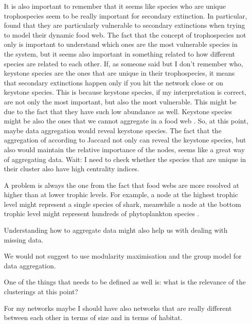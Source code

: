 \documentclass[twocolumn]{article}
\begin{document}
	It is also important to remember that it seems like species who are unique trophospecies seem to be really important for secondary extinction.
	In particular, \citep{Petchey2008a} found that they are particularly vulnerable to secondary extinctions when trying to model their dynamic food web.
	The fact that the concept of trophospecies not only is important to understand which ones are the most vulnerable species in the system, but it seems also important in something related to how different species are related to each other.
	If, as someone said but I don't remember who, keystone species are the ones that are unique in their trophospecies, it means that secondary extinctions happen only if you hit the network close or on keystone species.
	This is because keystone species, if my interpretation is correct, are not only the most important, but also the most vulnerable.
	This might be due to the fact that they have such low abundance as well.
	Keystone species might be also the ones that we cannot aggregate in a food web \citep{Bond1994}.
	So, at this point, maybe data aggregation would reveal keystone species.
	The fact that the aggregation of according to Jaccard not only can reveal the keystone species, but also would maintain the relative importance of the nodes, seems like a great way of aggregating data.
	Wait: I need to check whether the species that are unique in their cluster also have high centrality indices.
	\par
	A problem is always the one from the fact that food webs are more resolved at higher than at lower trophic levels.
	For example, a node at the highest trophic level might represent a single species of shark, meanwhile a node at the bottom trophic level might represent hundreds of phytoplankton species \citep{}.
	\par
	Understanding how to aggregate data might also help us with dealing with missing data.
	\par
	We would not suggest to use modularity maximisation and the group model for data aggregation.
	\par
	One of the things that needs to be defined as well is: what is the relevance of the clusterings at this point?
	\par
	For my networks maybe I should have also networks that are really different between each other in terms of size and in terms of habitat.
\end{document}
